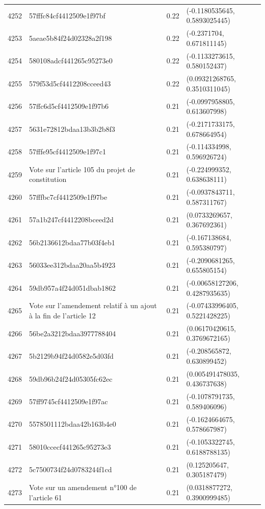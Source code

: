 \begin{table}[ht]
\begin{tabular}{rlrl}
  4252 & 57fffc84cf4412509e1f97bf & 0.22 & (-0.1180535645, 0.5893025445) \\ 
  4253 & 5aeae5b84f24d02328a2f198 & 0.22 & (-0.2371704, 0.671811145) \\ 
  4254 & 580108adcf441265c95273e0 & 0.22 & (-0.1133273615, 0.580152437) \\ 
  4255 & 579f53d5cf4412208cceed43 & 0.22 & (0.09321268765, 0.3510311045) \\ 
  4256 & 57ffc6d5cf4412509e1f97b6 & 0.21 & (-0.0997958805, 0.613607998) \\ 
  4257 & 5631e72812bdaa13b3b2b8f3 & 0.21 & (-0.2171733175, 0.678664954) \\ 
  4258 & 57fffe95cf4412509e1f97c1 & 0.21 & (-0.114334998, 0.596926724) \\ 
  4259 & Vote sur l'article 105 du projet de constitution & 0.21 & (-0.224999352, 0.638638111) \\ 
  4260 & 57fffbc7cf4412509e1f97be & 0.21 & (-0.0937843711, 0.587311767) \\ 
  4261 & 57a1b247cf4412208bceed2d & 0.21 & (0.0733269657, 0.367692361) \\ 
  4262 & 56b2136612bdaa77b03f4eb1 & 0.21 & (-0.167138684, 0.595380797) \\ 
  4263 & 56033ee312bdaa20aa5b4923 & 0.21 & (-0.2090681265, 0.655805154) \\ 
  4264 & 59db957a4f24d051dbab1862 & 0.21 & (-0.00658127206, 0.4287935635) \\ 
  4265 & Vote sur l'amendement relatif à un ajout à la fin de l'article 12 & 0.21 & (-0.07433996405, 0.5221428225) \\ 
  4266 & 56be2a3212bdaa3977788404 & 0.21 & (0.06170420615, 0.3769672165) \\ 
  4267 & 5b2129b94f24d0582e5d03fd & 0.21 & (-0.208565872, 0.630899452) \\ 
  4268 & 59db96b24f24d05305fc62ec & 0.21 & (0.005491478035, 0.436737638) \\ 
  4269 & 57ff9745cf4412509e1f97ac & 0.21 & (-0.1078791735, 0.589406096) \\ 
  4270 & 5578501112bdaa42b163b4e0 & 0.21 & (-0.1624664675, 0.578667987) \\ 
  4271 & 58010ccecf441265c95273e3 & 0.21 & (-0.1053322745, 0.6188788135) \\ 
  4272 & 5c7500734f24d0783244f1cd & 0.21 & (0.125205647, 0.305187479) \\ 
  4273 & Vote sur un amendement n°100 de l'article 61 & 0.21 & (0.0318877272, 0.3900999485) \\ 

\end{tabular}
\end{table}
